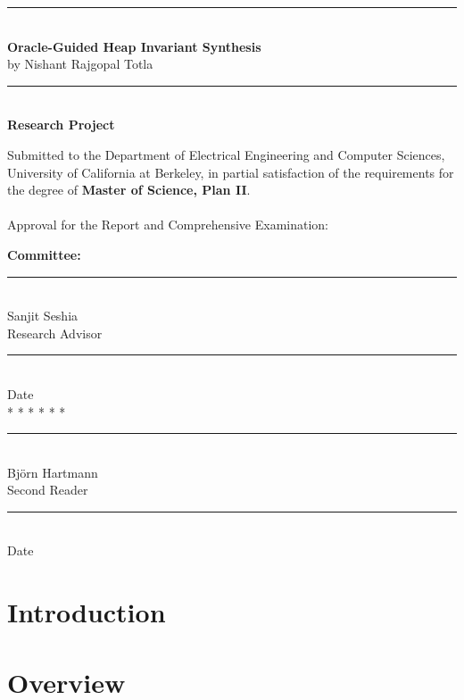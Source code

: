 \documentclass[12pt, letterpaper]{report}
\begin{document}
\large
\begin{center}
\rule[.1in]{6.5in}{.01in}\\
{\bf Oracle-Guided Heap Invariant Synthesis}\\
by Nishant Rajgopal Totla\\
\rule[.1in]{6.5in}{.01in}\\
{\bf Research Project}\\
\noindent
\end{center}
\normalsize
Submitted to the Department of Electrical Engineering and Computer
Sciences, University of California at Berkeley, in partial satisfaction
of the requirements for the degree of {\bf Master of Science, Plan II}.
\\
\\
\noindent
Approval for the Report and Comprehensive Examination:
\begin{center}
{\bf Committee:}\\
\vspace{9.5 mm}
\rule{3.5in}{.01in}\\
Sanjit Seshia\\
Research Advisor\\
\vspace{9.5 mm}
\rule{3.5in}{.01in}\\
Date\\
\vspace{7 mm}
* * * * * *\\
\vspace{9.5 mm}
\rule{3.5in}{.01in}\\
Bj{\"o}rn Hartmann\\
Second Reader\\
\vspace{9.5 mm}
\rule{3.5in}{.01in}\\
Date\\
\end{center}



\tableofcontents
\listoffigures

\chapter{Introduction}


\chapter{Overview}

\end{document}
